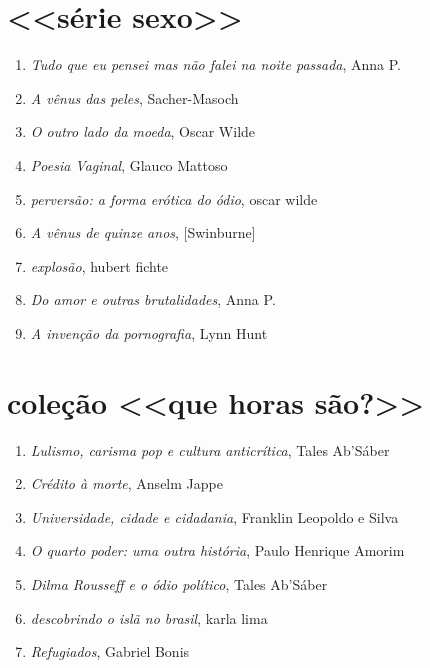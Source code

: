 
\section{<<série sexo>>}

\begin{enumerate}
\setlength\parskip{4.2pt}
\setlength\itemsep{-1.4mm}

\item \textit{Tudo que eu pensei mas não falei na noite passada}, Anna P.
\item \textit{A vênus das peles}, Sacher{}-Masoch
\item \textit{O outro lado da moeda}, Oscar Wilde
\item \textit{Poesia Vaginal}, Glauco Mattoso 
\item \textit{perversão: a forma erótica do ódio}, oscar wilde
\item \textit{A vênus de quinze anos}, [Swinburne]
\item \textit{explosão}, hubert fichte
\item \textit{Do amor e outras brutalidades}, Anna P.
\item \textit{A invenção da pornografia}, Lynn Hunt

\end{enumerate}

\medskip
\section{coleção <<que horas são?>>}

\begin{enumerate}
\setlength\parskip{4.2pt}
\setlength\itemsep{-1.4mm}
\item \textit{Lulismo, carisma pop e cultura anticrítica}, Tales Ab'Sáber
\item \textit{Crédito à morte}, Anselm Jappe
\item \textit{Universidade, cidade e cidadania}, Franklin Leopoldo e Silva
\item \textit{O quarto poder: uma outra história}, Paulo Henrique Amorim
\item \textit{Dilma Rousseff e o ódio político}, Tales Ab'Sáber
\item \textit{descobrindo o islã no brasil}, karla lima
\item \textit{Refugiados}, Gabriel Bonis
\end{enumerate}

\endgroup

\pagebreak
\ifodd\thepage\paginabranca\else\clearpage\fi
